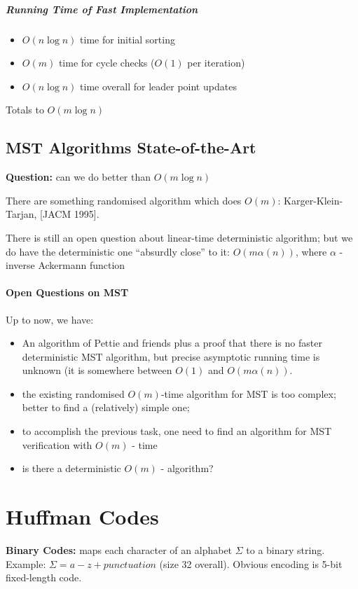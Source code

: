 \documentclass{scrartcl}
\begin{document}
\subparagraph{Running Time of Fast Implementation}
\begin{itemize}
\item $O(n \log n)$ time for initial sorting 
\item $O(m)$ time for cycle checks ($O(1)$ per iteration)
\item $O(n \log n)$ time overall for leader point updates
\end{itemize}
Totals to $O(m \log n)$

\subsection{MST Algorithms State-of-the-Art}
\label{sec:6-5}
{\bf Question: } can we do better than $O(m \log n)$ 

There are something randomised algorithm which does $O(m)$: Karger-Klein-Tarjan,
[JACM 1995].

There is still an open question about linear-time deterministic algorithm; but
we do have the deterministic one ``absurdly close'' to it: $O(m \alpha (n))$,
where $\alpha$ - inverse Ackermann function 
\paragraph{Open Questions on MST}
Up to now, we have:
\begin{itemize}
\item An algorithm of Pettie and friends plus a proof that there is no faster
  deterministic MST algorithm, but precise asymptotic running time is unknown
  (it is somewhere between $O(1)$ and $O(m \alpha (n))$.
\item the existing randomised $O(m)$-time algorithm for MST is too complex;
  better to find a (relatively) simple one;
\item to accomplish the previous task, one need to find an algorithm for MST
  verification with $O(m)$ - time
\item is there a deterministic $O(m)$ - algorithm?
\end{itemize}
\section{Huffman Codes}
\label{sec:7-1}
{\bf Binary Codes: } maps each character of an alphabet $\Sigma$ to a binary
string. \\
Example: $\Sigma = a - z + punctuation$ (size 32 overall). Obvious encoding is
5-bit fixed-length code.\\
\end{document}
